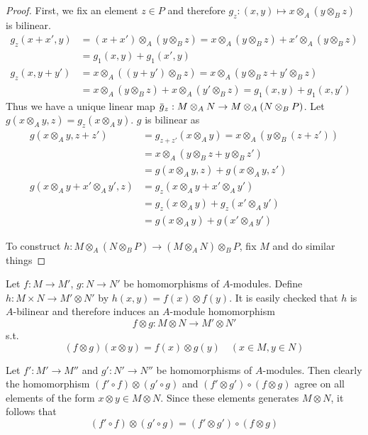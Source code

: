 \documentclass[11pt]{article}
\begin{document}
\begin{proof}
First, we fix an element \(z\in P\) and therefore \(g_z:(x,y)\mapsto x\otimes_A(y\otimes_Bz)\) is bilinear.
\begin{align*}
g_z(x+x',y)&=(x+x')\otimes_A(y\otimes_Bz)=x\otimes_A(y\otimes_Bz)+x'\otimes_A(y\otimes_Bz)\\&=g_1(x,y)+g_1(x',y)\\
g_z(x,y+y')&=x\otimes_A((y+y')\otimes_Bz)=x\otimes_A(y\otimes_Bz+y'\otimes_Bz)\\&=x\otimes_A(y\otimes_Bz)+x\otimes_A(y'\otimes_Bz)=g_1(x,y)+g_1(x,y')
\end{align*}
Thus we have a unique linear map \(\barg_z:M\otimes_AN\to M\otimes_A(N\otimes_BP)\). Let
\(g(x\otimes_Ay,z)=g_z(x\otimes_Ay)\). \(g\) is bilinear as
\begin{align*}
g(x\otimes_Ay,z+z')&=g_{z+z'}(x\otimes_Ay)=x\otimes_A(y\otimes_B(z+z'))\\&=x\otimes_A(y\otimes_Bz+y\otimes_Bz')\\
&=g(x\otimes_Ay,z)+g(x\otimes_Ay,z')\\
g(x\otimes_Ay+x'\otimes_Ay',z)&=g_z(x\otimes_Ay+x'\otimes_Ay')\\&=g_z(x\otimes_Ay)+g_z(x'\otimes_Ay')\\
&=g(x\otimes_Ay)+g(x'\otimes_Ay')
\end{align*}

To construct \(h:M\otimes_A(N\otimes_BP)\to(M\otimes_AN)\otimes_BP\), fix \(M\) and do similar things
\end{proof}

Let \(f:M\to M'\), \(g:N\to N'\) be homomorphisms of \(A\)-modules. Define \(h:M\times N\to M'\otimes N'\)
by \(h(x,y)=f(x)\otimes f(y)\). It is easily checked that \(h\) is \(A\)-bilinear and therefore
induces an \(A\)-module homomorphism
\begin{equation*}
f\otimes g:M\otimes N\to M'\otimes N'
\end{equation*}
s.t.
\begin{equation*}
(f\otimes g)(x\otimes y)=f(x)\otimes g(y)\quad(x\in M,y\in N)
\end{equation*}


Let \(f':M'\to M''\) and \(g':N'\to N''\) be homomorphisms of \(A\)-modules. Then clearly the
homomorphism \((f'\circ f)\otimes(g'\circ g)\) and \((f'\otimes g')\circ(f\otimes g)\) agree on all elements of the
form \(x\otimes y\in M\otimes N\). Since these elements generates \(M\otimes N\), it follows that
\begin{equation*}
(f'\circ f)\otimes(g'\circ g)=(f'\otimes g')\circ(f\otimes g)
\end{equation*}
\end{document}
